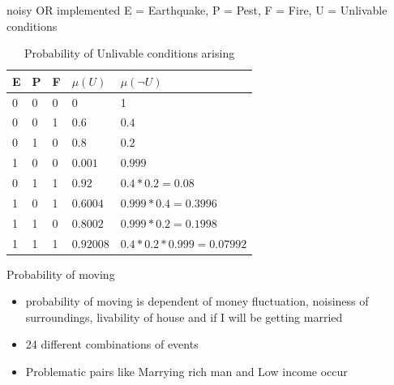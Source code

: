 \documentclass{beamer}
\begin{document}
\begin{frame}{noisy OR implemented}
E = Earthquake, P = Pest, F = Fire, U = Unlivable conditions\\
\hspace{5 mm}
\begin{centering}
\begin{table}
\begin{tabular}{|lll|ll|}
  \hline
  E & P & F & $\mu(U)$ & $\mu(\neg U)$   \\ \hline
  0 & 0 & 0 & 0 & 1 \\
  0 & 0 & 1  &  $0.6$       & $0.4$       \\ 
  0 & 1 & 0  &  $0.8$       & $0.2$       \\
  1 & 0 & 0  &  $0.001$     & $0.999$     \\                     
  0 & 1 & 1  &  $0.92$      & $0.4 * 0.2 =0.08$\\       
  1 & 0 & 1  &  $0.6004$    & $0.999 * 0.4 = 0.3996$\\   
  1 & 1 & 0  &  $0.8002$    & $0.999 * 0.2 = 0.1998$\\         
  1 & 1 & 1  &  $0.92008$   & $0.4 * 0.2 * 0.999 = 0.07992$ \\
  \hline
\end{tabular}
\caption{Probability of Unlivable conditions arising}
\end{table}
\end{centering}
\end{frame} 

\begin{frame}{Probability of moving}
    \begin{itemize}
        \item {probability of moving is dependent of money fluctuation,
            noisiness of surroundings, livability of house and if I will be
        getting married}
        \item{24 different combinations of events}
        \item{Problematic pairs like Marrying rich man and Low income occur}
    \end{itemize}
\end{frame}
\end{document}

